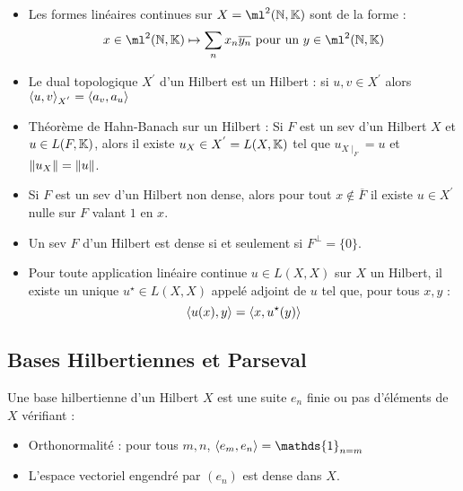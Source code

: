 \documentclass{cours}
\begin{document}
\begin{remark}
    \begin{itemize}
        \item Les formes linéaires continues sur $X = \ml^{2}(\N, \K)$ sont de la forme : 
        \[
            x \in \ml^{2}(\N, \K) \mapsto \sum_{n} x_{n}\overline{y_{n}} \text{ pour un } y \in \ml^{2}(\N, \K)
        \]
        \item Le dual topologique $X^{'}$ d'un Hilbert est un Hilbert : si $u, v \in X^{'}$ alors $\left\langle u, v \right\rangle_{X^{'}} = \left\langle a_{v}, a_{u} \right\rangle$
        \item Théorème de Hahn-Banach sur un Hilbert : Si $F$ est un sev d'un Hilbert $X$ et $u \in L(F, \mathbb{K})$, alors il existe $u_{X} \in X^{'} = L(X, \mathbb{K})$ tel que $u_{X \mid_{F}} = u$ et $\left\lVert u_{X} \right\rVert = \left\lVert u \right\rVert$.
        \item Si $F$ est un sev d'un Hilbert non dense, alors pour tout $x \notin \overline{F}$ il existe $u \in X^{'}$ nulle sur $F$ valant $1$ en $x$.
        \item Un sev $F$ d'un Hilbert est dense si et seulement si $F^{\perp}= \{0\}$.
        \item Pour toute application linéaire continue $u \in L(X, X)$ sur $X$ un Hilbert, il existe un unique $u^{\star} \in L(X, X)$ appelé adjoint de $u$ tel que, pour tous $x, y$ : 
        \[
            \left\langle u(x), y \right\rangle = \left\langle x, u^{\star}(y) \right\rangle
        \]
    \end{itemize}
\end{remark}

\subsection{Bases Hilbertiennes et Parseval}
\begin{definition}
    Une base hilbertienne d'un Hilbert $X$ est une suite $e_{n}$ finie ou pas d'éléments de $X$ vérifiant : 
    \begin{itemize}
        \item Orthonormalité : pour tous $m, n$, $\scalar{e_{m}, e_{n}} = \mathds{1}_{n = m}$
        \item L'espace vectoriel engendré par $(e_{n})$ est dense dans $X$. 
    \end{itemize}
\end{definition}
\end{document}
